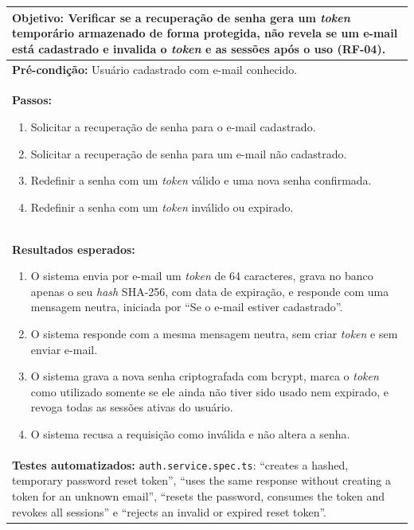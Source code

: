 \FloatBarrier
\begin{quadro}[h!]
\caption{Caso de teste CT02: validar a redefinição de senha por \textit{token} temporário}
\label{quad:ct02}
\begin{tabular}{|p{\dimexpr\linewidth-2\tabcolsep-2\arrayrulewidth\relax}|}
\hline
\textbf{Objetivo:} Verificar se a recuperação de senha gera um \textit{token} temporário armazenado de forma protegida, não revela se um e-mail está cadastrado e invalida o \textit{token} e as sessões após o uso (RF-04). \\ \hline
\textbf{Pré-condição:} Usuário cadastrado com e-mail conhecido. \\ \hline
\textbf{Passos:}
\begin{enumerate}[nosep,leftmargin=1.2em,topsep=2pt,partopsep=0pt,parsep=0pt,itemsep=1pt]
  \item Solicitar a recuperação de senha para o e-mail cadastrado.
  \item Solicitar a recuperação de senha para um e-mail não cadastrado.
  \item Redefinir a senha com um \textit{token} válido e uma nova senha confirmada.
  \item Redefinir a senha com um \textit{token} inválido ou expirado.
\end{enumerate} \\ \hline
\textbf{Resultados esperados:}
\begin{enumerate}[nosep,leftmargin=1.2em,topsep=2pt,partopsep=0pt,parsep=0pt,itemsep=1pt]
  \item O sistema envia por e-mail um \textit{token} de 64 caracteres, grava no banco apenas o seu \textit{hash} SHA-256, com data de expiração, e responde com uma mensagem neutra, iniciada por ``Se o e-mail estiver cadastrado''.
  \item O sistema responde com a mesma mensagem neutra, sem criar \textit{token} e sem enviar e-mail.
  \item O sistema grava a nova senha criptografada com bcrypt, marca o \textit{token} como utilizado somente se ele ainda não tiver sido usado nem expirado, e revoga todas as sessões ativas do usuário.
  \item O sistema recusa a requisição como inválida e não altera a senha.
\end{enumerate} \\ \hline
\textbf{Testes automatizados:} \texttt{auth.service.spec.ts}: ``creates a hashed, temporary password reset token'', ``uses the same response without creating a token for an unknown email'', ``resets the password, consumes the token and revokes all sessions'' e ``rejects an invalid or expired reset token''. \\ \hline
\end{tabular}
\end{quadro}

